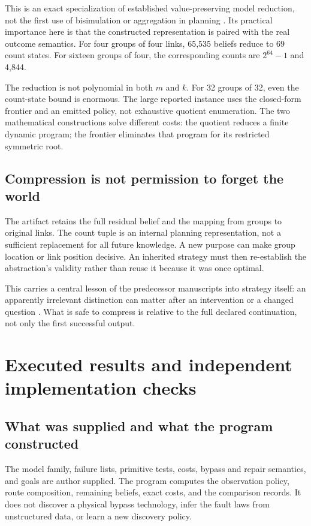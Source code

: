 \documentclass[11pt,letterpaper]{article}
\theoremstyle{remark}\newtheorem{remark}{Remark}[section]
\begin{document}
This is an exact specialization of established value-preserving model reduction, not the first use of bisimulation or aggregation in planning \citep{givan}. Its practical importance here is that the constructed representation is paired with the real outcome semantics. For four groups of four links, 65,535 beliefs reduce to 69 count states. For sixteen groups of four, the corresponding counts are $2^{64}-1$ and 4,844.

The reduction is not polynomial in both $m$ and $k$. For 32 groups of 32, even the count-state bound is enormous. The large reported instance uses the closed-form frontier and an emitted policy, not exhaustive quotient enumeration. The two mathematical constructions solve different costs: the quotient reduces a finite dynamic program; the frontier eliminates that program for its restricted symmetric root.

\subsection{Compression is not permission to forget the world}
The artifact retains the full residual belief and the mapping from groups to original links. The count tuple is an internal planning representation, not a sufficient replacement for all future knowledge. A new purpose can make group location or link position decisive. An inherited strategy must then re-establish the abstraction's validity rather than reuse it because it was once optimal.

This carries a central lesson of the predecessor manuscripts into strategy itself: an apparently irrelevant distinction can matter after an intervention or a changed question \citep{packet}. What is safe to compress is relative to the full declared continuation, not only the first successful output.

\section{Executed results and independent implementation checks}
\label{sec:results}
\subsection{What was supplied and what the program constructed}
The model family, failure lists, primitive tests, costs, bypass and repair semantics, and goals are author supplied. The program computes the observation policy, route composition, remaining beliefs, exact costs, and the comparison records. It does not discover a physical bypass technology, infer the fault laws from unstructured data, or learn a new discovery policy.
\end{document}
